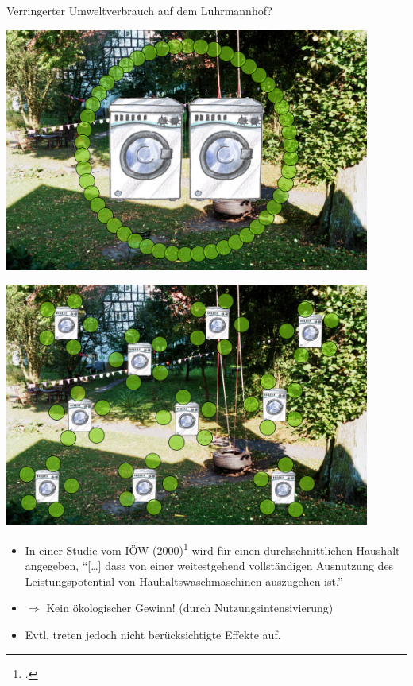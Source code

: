 \documentclass[beamer, xcolor={table,usenames,dvipsnames}]{beamer}
\newcommand{\n}[1]{n_\text{#1}}
\renewcommand{\t}[1]{t_\text{#1}}
\begin{document}
    \begin{frame}{Verringerter Umweltverbrauch auf dem Luhrmannhof?}
        \begin{minipage}[t]{0.45\textwidth}
            \includegraphics[width=0.9\textwidth]{Luhrmannhof50x2.pdf}
        \end{minipage}
        \hfill
        \begin{minipage}[t]{0.45\textwidth}
            \includegraphics[width=0.9\textwidth]{Luhrmannhof10x5.pdf}
        \end{minipage}
        \pause
        \begin{itemize}
            \item In einer Studie vom IÖW
                (2000)\footcite[S.57]{hirschl_produkte_2000} wird für einen
                durchschnittlichen Haushalt angegeben, "`[\dots] dass von einer
                weitestgehend vollständigen Ausnutzung des Leistungspotential
                von Hauhaltswaschmaschinen auszugehen ist."' 
                \pause
            \item[] $\Rightarrow$ Kein ökologischer Gewinn! (durch
                Nutzungsintensivierung)
                \pause
            \item Evtl. treten jedoch nicht berücksichtigte Effekte auf.
        \end{itemize}
    \end{frame}
\end{document}
